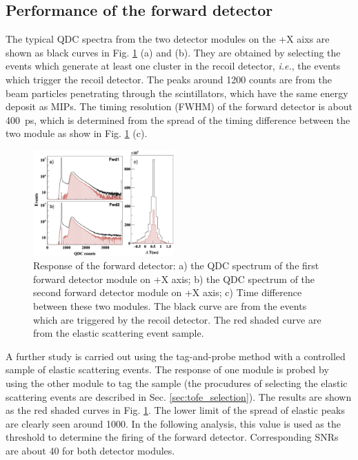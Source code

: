 \documentclass[number,5p]{elsarticle}
\begin{document}
\subsection{Performance of the forward detector}
\label{sec:fwd_performance}

The typical QDC spectra from the two detector modules on the +X aixs are shown as
black curves in Fig. \ref{fig:fwd_performance} (a) and (b).
They are obtained by selecting the events which generate at least one cluster in the recoil detector, \textit{i.e.}, the events which trigger the recoil detector.
The peaks around \num{1200} counts are from the beam particles penetrating
through the scintillators, which have the same energy deposit as MIPs.
The timing resolution (FWHM) of the forward detector is about \SI{400}{ps}, which is determined from the spread of the timing difference between the two module as show in Fig. \ref{fig:fwd_performance} (c).
\begin{figure}[tb!]
  \centering
  \includegraphics[width=0.48\textwidth]{./fwd_performance_elastic.png}
  \caption{Response of the forward detector: a) the QDC spectrum of the first forward detector module on +X axis;
    b) the QDC spectrum of the second forward detector module on +X axis; c) Time difference between these two modules.
    The black curve are from the events which are triggered by the recoil
    detector.
    The red shaded curve are from the elastic scattering event sample.
  }
  \label{fig:fwd_performance}
\end{figure}

A further study is carried out using the tag-and-probe method with a controlled
sample of elastic scattering events.
The response of one module is probed by using the other module to tag the sample
(the procudures of selecting the elastic scattering events are described in Sec. \ref{sec:tofe_selection}).
The results are shown as the red shaded curves in Fig. \ref{fig:fwd_performance}.
The lower limit of the spread of elastic peaks are clearly seen around \num{1000}.
In the following analysis, this value is used as the threshold to determine the firing of the forward detector.
Corresponding SNRs are about \num{40} for both detector modules.
\end{document}
